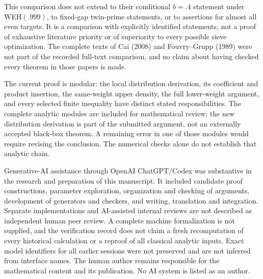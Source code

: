 This comparison does not extend to their conditional $b=.4$
statement under WEH$(.999)$, to fixed-gap twin-prime statements,
or to assertions for almost all even targets.  It is a comparison
with explicitly identified statements, not a proof of exhaustive
literature priority or of superiority to every possible sieve
optimization.  The complete texts of Cai (2008) and
Fouvry--Grupp (1989) were not part of the recorded full-text
comparison, and no claim about having checked every theorem in
those papers is made.

The current proof is modular: the local distribution derivation,
its coefficient and product insertion, the same-weight upper
density, the full lower-weight argument, and every selected finite
inequality have distinct stated responsibilities.  The complete
analytic modules are included for mathematical review; the new
distribution derivation is part of the submitted argument, not an
externally accepted black-box theorem.  A remaining error in one
of those modules would require revising the conclusion.  The
numerical checks alone do not establish that analytic chain.

Generative-AI assistance through OpenAI ChatGPT/Codex was substantive
in the research and preparation of this manuscript.  It included
candidate proof constructions, parameter exploration, organization
and checking of arguments, development of generators and checkers,
and writing, translation and integration.  Separate implementations
and AI-assisted internal reviews are not described as independent
human peer review.  A complete machine formalization is not
supplied, and the verification record does not claim a fresh
recomputation of every historical calculation or a reproof of all
classical analytic inputs.  Exact model identifiers for all earlier
sessions were not preserved and are not inferred from interface
names.  The human author remains responsible for the mathematical
content and its publication.  No AI system is listed as an author.
